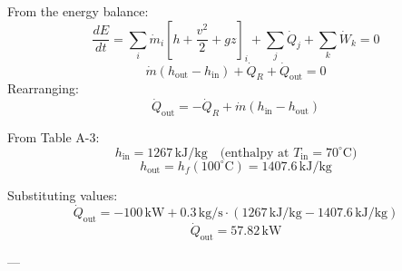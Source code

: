 From the energy balance:  
\[
\frac{dE}{dt} = \sum_i \dot{m}_i \left[ h + \frac{v^2}{2} + gz \right]_i + \sum_j \dot{Q}_j + \sum_k \dot{W}_k = 0
\]  
\[
\dot{m} \left( h_{\text{out}} - h_{\text{in}} \right) + \dot{Q}_R + \dot{Q}_{\text{out}} = 0
\]  
Rearranging:  
\[
\dot{Q}_{\text{out}} = -\dot{Q}_R + \dot{m} \left( h_{\text{in}} - h_{\text{out}} \right)
\]  

From Table A-3:  
\[
h_{\text{in}} = 1267 \, \text{kJ/kg} \quad \text{(enthalpy at } T_{\text{in}} = 70^\circ\text{C})
\]  
\[
h_{\text{out}} = h_f(100^\circ\text{C}) = 1407.6 \, \text{kJ/kg}
\]  

Substituting values:  
\[
\dot{Q}_{\text{out}} = -100 \, \text{kW} + 0.3 \, \text{kg/s} \cdot \left( 1267 \, \text{kJ/kg} - 1407.6 \, \text{kJ/kg} \right)
\]  
\[
\dot{Q}_{\text{out}} = 57.82 \, \text{kW}
\]  

---